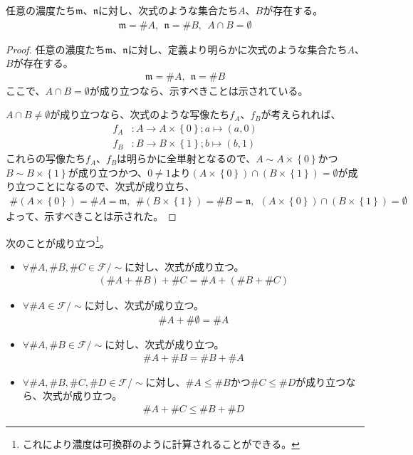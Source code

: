 \documentclass[dvipdfmx]{jsarticle}
\begin{document}
\begin{thm}\label{1.2.8.2}
任意の濃度たち$\mathfrak{m}$、$\mathfrak{n}$に対し、次式のような集合たち$A$、$B$が存在する。
\begin{align*}
\mathfrak{m} =\# A,\ \ \mathfrak{n} =\# B,\ \ A \cap B = \emptyset 
\end{align*}
\end{thm}
\begin{proof}
任意の濃度たち$\mathfrak{m}$、$\mathfrak{n}$に対し、定義より明らかに次式のような集合たち$A$、$B$が存在する。
\begin{align*}
\mathfrak{m} =\# A,\ \ \mathfrak{n} =\# B
\end{align*}
ここで、$A \cap B = \emptyset $が成り立つなら、示すべきことは示されている。\par
$A \cap B \neq \emptyset $が成り立つなら、次式のような写像たち$f_{A}$、$f_{B}$が考えられれば、
\begin{align*}
f_{A}&:A \rightarrow A \times \left\{ 0 \right\};a \mapsto (a,0)\\
f_{B}&:B \rightarrow B \times \left\{ 1 \right\};b \mapsto (b,1)
\end{align*}
これらの写像たち$f_{A}$、$f_{B}$は明らかに全単射となるので、$A \sim A \times \left\{ 0 \right\}$かつ$B \sim B \times \left\{ 1 \right\}$が成り立つかつ、$0 \neq 1$より$\left( A \times \left\{ 0 \right\} \right) \cap \left( B \times \left\{ 1 \right\} \right) = \emptyset $が成り立つことになるので、次式が成り立ち、
\begin{align*}
\# \left( A \times \left\{ 0 \right\} \right) = \# A = \mathfrak{m},\ \ \# \left( B \times \left\{ 1 \right\} \right) = \# B = \mathfrak{n,\ \ }\left( A \times \left\{ 0 \right\} \right) \cap \left( B \times \left\{ 1 \right\} \right) = \emptyset 
\end{align*}
よって、示すべきことは示された。
\end{proof}
\begin{thm}\label{1.2.8.3}
次のことが成り立つ\footnote{これにより濃度は可換群のように計算されることができる。}。
\begin{itemize}
\item
  $\forall\# A,\# B,\# C \in \mathcal{F} /\sim $に対し、次式が成り立つ。
\begin{align*}
\left( \# A + \# B \right) + \# C = \# A + \left( \# B + \# C \right)
\end{align*}
\item
  $\forall\# A \in \mathcal{F} /\sim $に対し、次式が成り立つ。
\begin{align*}
\# A + \# \emptyset  = \# A
\end{align*}
\item
  $\forall\# A,\# B \in \mathcal{F} /\sim $に対し、次式が成り立つ。
\begin{align*}
\# A + \# B = \# B + \# A
\end{align*}
\item
  $\forall\# A,\# B,\# C,\# D \in \mathcal{F} /\sim $に対し、$\# A \leq \# B$かつ$\# C \leq \# D$が成り立つなら、次式が成り立つ。
\begin{align*}
\# A + \# C \leq \# B + \# D
\end{align*}
\end{itemize}
\end{thm}
\end{document}
